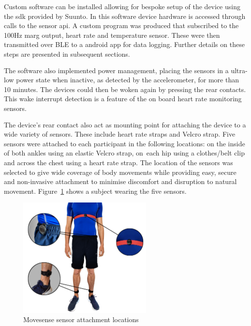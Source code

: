 Custom software can be installed allowing for bespoke setup of the device using the \acrfull{sdk} provided by Suunto. In this software device hardware is accessed through calls to the sensor \acrfull{api}. A custom program was produced that subscribed to the 100Hz \acrshort{marg} output, heart rate and temperature sensor. These were then transmitted over BLE to a android app for data logging. Further details on these steps are presented in subsequent sections.

The software also implemented power management, placing the sensors in a ultra-low power state when inactive, as detected by the accelerometer, for more than 10 minutes. The devices could then be woken again by pressing the rear contacts. This wake interrupt detection is a feature of the on board heart rate monitoring sensors.

The device's rear contact also act as mounting point for attaching the device to a wide variety of sensors. These include heart rate straps and Velcro strap. Five sensors were attached to each participant in the following locations: on the inside of both ankles using an elastic Velcro strap, on~each hip using a clothes/belt clip and across the chest using a heart rate strap. The location of the sensors was selected to give wide coverage of body movements while providing easy, secure and non-invasive attachment to minimise discomfort and disruption to natural movement. Figure~\ref{fig:methods-movesense-sensor-locations} shows a subject wearing the five sensors.

\begin{figure}[hbt]
    \centering
    \includegraphics[width=0.6\textwidth]{content/3-Methods/sensor_locations.png}
    \caption{Movesense sensor attachment locations \cite{Sherratt2021}}
    \label{fig:methods-movesense-sensor-locations}
\end{figure}

